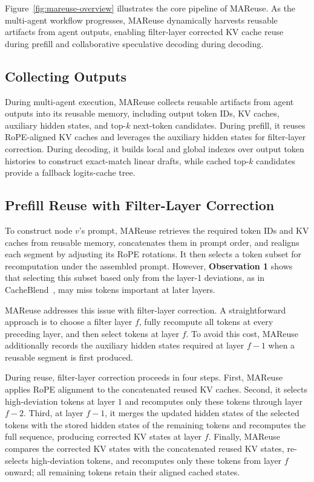 \documentclass[letterpaper]{article} %
\begin{document}
Figure~\ref{fig:mareuse-overview} illustrates the core pipeline of MAReuse. As the multi-agent workflow progresses, MAReuse dynamically harvests reusable artifacts from agent outputs, enabling filter-layer corrected KV cache reuse during prefill and collaborative speculative decoding during decoding.

\subsection{Collecting Outputs}
During multi-agent execution, MAReuse collects reusable artifacts from agent outputs into its reusable memory, including output token IDs, KV caches, auxiliary hidden states, and top-$k$ next-token candidates. During prefill, it reuses RoPE-aligned KV caches and leverages the auxiliary hidden states for filter-layer correction. During decoding, it builds local and global indexes over output token histories to construct exact-match linear drafts, while cached top-$k$ candidates provide a fallback logits-cache tree.

\subsection{Prefill Reuse with Filter-Layer Correction}

To construct node $v$'s prompt, MAReuse retrieves the required token IDs and KV caches from reusable memory, concatenates them in prompt order, and realigns each segment by adjusting its RoPE rotations. It then selects a token subset for recomputation under the assembled prompt. However, \textbf{Observation 1} shows that selecting this subset based only from the layer-1 deviations, as in CacheBlend~\citep{DBLP:conf/eurosys/YaoLLRCZD0J25}, may miss tokens important at later layers.

MAReuse addresses this issue with filter-layer correction. A straightforward approach is to choose a filter layer $f$, fully recompute all tokens at every preceding layer, and then select tokens at layer $f$. To avoid this cost, MAReuse additionally records the auxiliary hidden states required at layer $f-1$ when a reusable segment is first produced.

During reuse, filter-layer correction proceeds in four steps. First, MAReuse applies RoPE alignment to the concatenated reused KV caches. Second, it selects high-deviation tokens at layer $1$ and recomputes only these tokens through layer $f-2$. Third, at layer $f-1$, it merges the updated hidden states of the selected tokens with the stored hidden states of the remaining tokens and recomputes the full sequence, producing corrected KV states at layer $f$. Finally, MAReuse compares the corrected KV states with the concatenated reused KV states, re-selects high-deviation tokens, and recomputes only these tokens from layer $f$ onward; all remaining tokens retain their aligned cached states.
\end{document}
